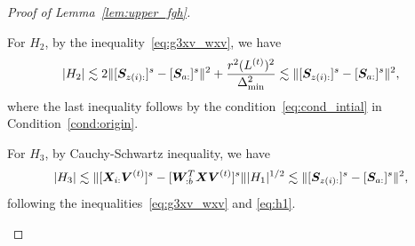 \documentclass[lettersize,onecolumn,journal]{IEEEtran}
\theoremstyle{definition}
\theoremstyle{definition}
\begin{document}
\begin{proof}[Proof of Lemma~\ref{lem:upper_fgh}]
\begin{enumerate}
    
    For $H_2$, by the inequality~\eqref{eq:g3xv_wxv}, we have 
    \begin{equation}\label{eq:h2}
        |H_2| \lesssim 2 \onormSize{}{ [ \mS_{z(i):} ]^s - [ \mS_{a:}]^s }^2 + \frac{r^2 (L^{(t)})^2}{\Delta_{\min}^2} \lesssim \onormSize{}{ [ \mS_{z(i):} ]^s - [ \mS_{a:}]^s }^2,
    \end{equation}
    where the last inequality follows by the condition~\eqref{eq:cond_intial} in Condition~\ref{cond:origin}.
    
    
    For $H_3$,  by Cauchy-Schwartz inequality, we have 
    \begin{equation}\label{eq:h3}
         |H_3| \lesssim \onormSize{}{[\mX_{i:} \mV^{(t)}]^s  -  [  \mW_{:b}^T \mX \mV^{(t)} ]^s} |H_1|^{1/2} \lesssim \onormSize{}{ [ \mS_{z(i):} ]^s - [ \mS_{a:}]^s }^2,
    \end{equation}
    following the inequalities~\eqref{eq:g3xv_wxv} and \eqref{eq:h1}.
    
    

\end{enumerate}
\end{proof}
\end{document}
